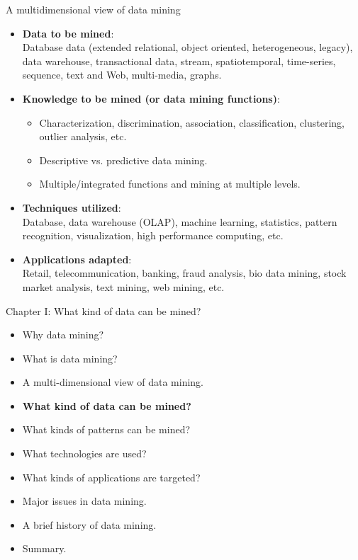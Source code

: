 \documentclass[aspectratio=169,t]{beamer}
\begin{document}
  { 
    \begin{frame}{A multidimensional view of data mining}
        \begin{itemize}
            \item \textbf{Data to be mined}:\\
                  \small{Database data (extended relational, object oriented, heterogeneous, legacy), data warehouse, transactional data, stream, spatiotemporal, time-series, sequence, text and Web, multi-media, graphs.}
            \item \textbf{Knowledge to be mined (or data mining functions)}:\\
                  \begin{itemize}
                      \item Characterization, discrimination, association, classification, clustering, outlier analysis, etc.
                      \item Descriptive vs. predictive data mining.
                      \item Multiple/integrated functions and mining at multiple levels.
                  \end{itemize}
            \item \textbf{Techniques utilized}:\\
                  \small{Database, data warehouse (OLAP), machine learning, statistics, pattern recognition, visualization, high performance computing, etc.}
            \item \textbf{Applications adapted}:\\
                  \small{Retail, telecommunication, banking, fraud analysis, bio data mining, stock market analysis, text mining, web mining, etc.}
        \end{itemize}
    \end{frame}
  }

  { 
    \begin{frame}{Chapter I: What kind of data can be mined?}
        \begin{itemize}
            \item Why data mining?
            \item What is data mining?
            \item A multi-dimensional view of data mining.
            \item \textbf{What kind of data can be mined?}
            \item What kinds of patterns can be mined?
            \item What technologies are used?
            \item What kinds of applications are targeted?
            \item Major issues in data mining.
            \item A brief history of data mining.
            \item Summary.
        \end{itemize}
    \end{frame}
  }
\end{document}
